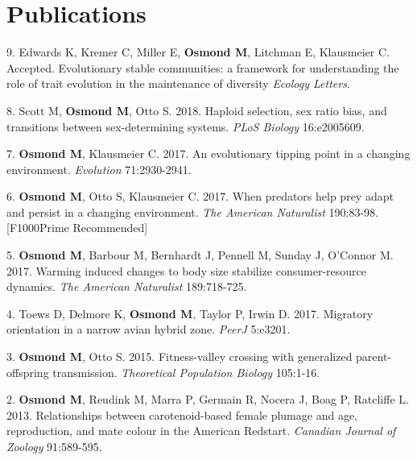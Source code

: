 \documentclass[12pt]{article}
\begin{document}
\section*{Publications}


\noindent\hspace{.1cm}9. Edwards K, Kremer C, Miller E, \textbf{Osmond M}, Litchman E, Klausmeier C. Accepted. Evolutionary stable communities: a framework for understanding the role of trait evolution in the maintenance of diversity \textit{Ecology Letters}.

\noindent\hspace{.1cm}8. Scott M, \textbf{Osmond M}, Otto S. 2018. Haploid selection, sex ratio bias, and transitions between sex-determining systems. \textit{PLoS Biology} 16:e2005609.

\noindent\hspace{.1cm}7. \textbf{Osmond M}, Klausmeier C. 2017. An evolutionary tipping point in a changing environment. \textit{Evolution} 71:2930-2941.

\noindent\hspace{.1cm}6. \textbf{Osmond M}, Otto S, Klausmeier C. 2017. When predators help prey adapt and persist in a changing environment. \textit{The American Naturalist} 190:83-98. [F1000Prime Recommended]

\noindent\hspace{.1cm}5. \textbf{Osmond M}, Barbour M, Bernhardt J, Pennell M, Sunday J, O'Connor M. 2017. Warming induced changes to body size stabilize consumer-resource dynamics. \textit{The American Naturalist} 189:718-725.

\noindent\hspace{.1cm}4. Toews D, Delmore K, \textbf{Osmond M}, Taylor P, Irwin D. 2017. Migratory orientation in a narrow avian hybrid zone. \textit{PeerJ} 5:e3201.

\noindent\hspace{.1cm}3. \textbf{Osmond M}, Otto S. 2015. Fitness-valley crossing with generalized parent-offspring transmission. \textit{Theoretical Population Biology} 105:1-16. %

\noindent\hspace{.1cm}2. \textbf{Osmond M}, Reudink M, Marra P, Germain R, Nocera J,  Boag P, Ratcliffe L.  2013. Relationships between carotenoid-based female plumage and age, reproduction, and mate colour in the American Redstart. \textit{Canadian Journal of Zoology} 91:589-595. %
\end{document}
